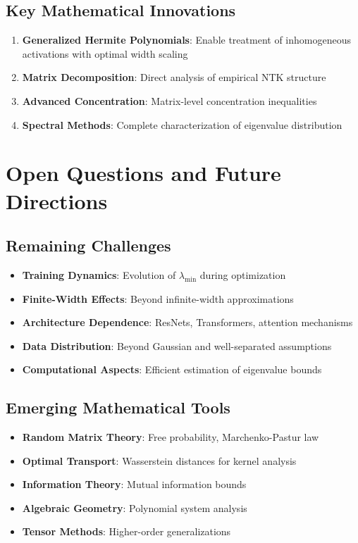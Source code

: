 \documentclass{article}
\newcommand{\lambdaMin}{\lambda_{\min}}
\begin{document}
\subsection{Key Mathematical Innovations}

\begin{enumerate}
    \item \textbf{Generalized Hermite Polynomials}: Enable treatment of inhomogeneous activations with optimal width scaling
    \item \textbf{Matrix Decomposition}: Direct analysis of empirical NTK structure
    \item \textbf{Advanced Concentration}: Matrix-level concentration inequalities
    \item \textbf{Spectral Methods}: Complete characterization of eigenvalue distribution
\end{enumerate}

\section{Open Questions and Future Directions}

\subsection{Remaining Challenges}

\begin{itemize}
    \item \textbf{Training Dynamics}: Evolution of $\lambdaMin$ during optimization
    \item \textbf{Finite-Width Effects}: Beyond infinite-width approximations
    \item \textbf{Architecture Dependence}: ResNets, Transformers, attention mechanisms
    \item \textbf{Data Distribution}: Beyond Gaussian and well-separated assumptions
    \item \textbf{Computational Aspects}: Efficient estimation of eigenvalue bounds
\end{itemize}

\subsection{Emerging Mathematical Tools}

\begin{itemize}
    \item \textbf{Random Matrix Theory}: Free probability, Marchenko-Pastur law
    \item \textbf{Optimal Transport}: Wasserstein distances for kernel analysis
    \item \textbf{Information Theory}: Mutual information bounds
    \item \textbf{Algebraic Geometry}: Polynomial system analysis
    \item \textbf{Tensor Methods}: Higher-order generalizations
\end{itemize}
\end{document}
